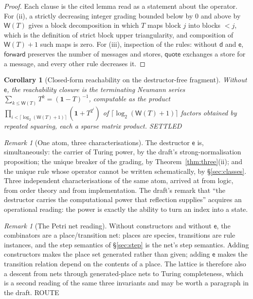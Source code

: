 \documentclass[11pt,a4paper]{article}
\theoremstyle{plain}
\newtheorem{corollary}[theorem]{Corollary}
\theoremstyle{definition}
\theoremstyle{remark}
\newtheorem{remark}[theorem]{Remark}
\newcommand{\dd}{\mathsf{d}}
\newcommand{\ev}{\mathsf{e}}
\newcommand{\Wt}{\mathsf{W}}
\begin{document}
\begin{proof}
Each clause is the cited lemma read as a statement about the operator. For
(ii), a strictly decreasing integer grading bounded below by $0$ and above by
$\Wt(T)$ gives a block decomposition in which $T$ maps block $j$ into blocks
$< j$, which is the definition of strict block upper triangularity, and
composition of $\Wt(T)+1$ such maps is zero. For (iii), inspection of the
rules: without $\dd$ and $\ev$, $\mathsf{forward}$ preserves the number of
messages and stores, $\mathsf{quote}$ exchanges a store for a message, and
every other rule decreases it.
\end{proof}

\begin{corollary}[Closed-form reachability on the destructor-free fragment]
\label{cor:neumann}
Without $\ev$, the reachability closure is the terminating Neumann series
$\sum_{k \le \Wt(T)} T^{k} = (\mathbf{1} - T)^{-1}$, computable as the product
$\prod_{i < \lceil \log_2 (\Wt(T)+1)\rceil} (\mathbf{1} + T^{2^{i}})$ of
$\lceil \log_2 (\Wt(T)+1)\rceil$ factors obtained by repeated squaring, each
a sparse matrix product.
\textsf{SETTLED}
\end{corollary}

\begin{remark}[One atom, three characterisations]
\label{rem:evthrice}
The destructor $\ev$ is, simultaneously: the carrier of Turing power, by the
draft's strong-normalisation proposition; the unique breaker of the grading,
by Theorem~\ref{thm:three}(ii); and the unique rule whose operator cannot be
written schematically, by \S\ref{sec:classes}. Three independent
characterisations of the same atom, arrived at from logic, from order theory
and from implementation. The draft's remark that ``the destructor carries the
computational power that reflection supplies'' acquires an operational
reading: the power is exactly the ability to turn an index into a state.
\end{remark}

\begin{remark}[The Petri net reading]
Without constructors and without $\ev$, the combinators are a
place/transition net: places are species, transitions are rule instances, and
the step semantics of \S\ref{sec:step} is the net's step semantics. Adding
constructors makes the place set generated rather than given; adding $\ev$
makes the transition relation depend on the contents of a place. The lattice
is therefore also a descent from nets through generated-place nets to Turing
completeness, which is a second reading of the same three invariants and may
be worth a paragraph in the draft. \textsf{ROUTE}
\end{remark}
\end{document}
